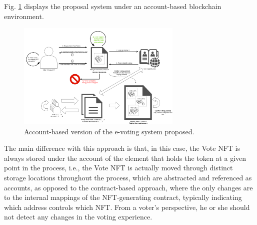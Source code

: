 \documentclass[./4_GeneralApproach.tex]{subfiles}
\begin{document}
    Fig. \ref{fig:account_based_architecture} displays the proposal system under an account-based blockchain environment. 
                
    \begin{figure}[htp]
        \centering
        \includegraphics[width=0.7\textwidth]{../Images/03_account_based_solution.png}
        \caption{Account-based version of the e-voting system proposed.}
        \label{fig:account_based_architecture}
    \end{figure}

    The main difference with this approach is that, in this case, the Vote NFT is always stored under the account of the element that holds the token at a given point in the process, i.e., the Vote NFT is actually moved through distinct storage locations throughout the process, which are abstracted and referenced as accounts, as opposed to the contract-based approach, where the only changes are to the internal mappings of the NFT-generating contract, typically indicating which address controls which NFT. From a voter's perspective, he or she should not detect any changes in the voting experience.
\end{document}
